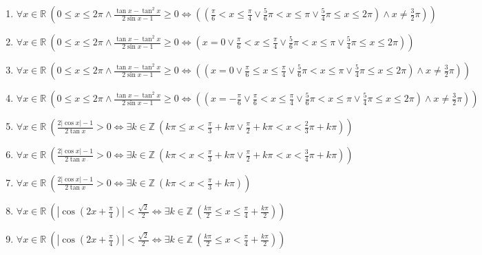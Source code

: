\documentclass[11pt,a4paper]{article}
\begin{document}
\begin{enumerate}
\item $\displaystyle \forall x \in \mathbb{R}\ \left( 0 \le x \le 2\pi \land \frac{\tan x - \tan^{2} x}{2\sin x - 1} \ge 0 \iff \left( \left(\frac{\pi}{6} < x \le \frac{\pi}{4} \lor \frac{5}{6}\pi < x \le \pi \lor \frac{5}{4}\pi \le x \le 2\pi\right) \land x \neq \frac{3}{2}\pi \right) \right)$
\item $\displaystyle \forall x \in \mathbb{R}\ \left( 0 \le x \le 2\pi \land \frac{\tan x - \tan^{2} x}{2\sin x - 1} \ge 0 \iff \left( x = 0 \lor \frac{\pi}{6} < x \le \frac{\pi}{4} \lor \frac{5}{6}\pi < x \le \pi \lor \frac{5}{4}\pi \le x \le 2\pi \right) \right)$
\item $\displaystyle \forall x \in \mathbb{R}\ \left( 0 \le x \le 2\pi \land \frac{\tan x - \tan^{2} x}{2\sin x - 1} \ge 0 \iff \left( \left(x = 0 \lor \frac{\pi}{6} \le x \le \frac{\pi}{4} \lor \frac{5}{6}\pi < x \le \pi \lor \frac{5}{4}\pi \le x \le 2\pi\right) \land x \neq \frac{3}{2}\pi \right) \right)$
\item $\displaystyle \forall x \in \mathbb{R}\ \left( 0 \le x \le 2\pi \land \frac{\tan x - \tan^{2} x}{2\sin x - 1} \ge 0 \iff \left( \left(x = -\frac{\pi}{6} \lor \frac{\pi}{6} < x \le \frac{\pi}{4} \lor \frac{5}{6}\pi < x \le \pi \lor \frac{5}{4}\pi \le x \le 2\pi\right) \land x \neq \frac{3}{2}\pi \right) \right)$
\item $\displaystyle \forall x \in \mathbb{R}\ \left( \frac{2\left|\cos x\right| - 1}{2\tan x} > 0 \iff \exists k \in \mathbb{Z}\ \left( k\pi \le x < \frac{\pi}{3} + k\pi \lor \frac{\pi}{2} + k\pi < x < \frac{2}{3}\pi + k\pi \right) \right)$
\item $\displaystyle \forall x \in \mathbb{R}\ \left( \frac{2\left|\cos x\right| - 1}{2\tan x} > 0 \iff \exists k \in \mathbb{Z}\ \left( k\pi < x < \frac{\pi}{3} + k\pi \lor \frac{\pi}{2} + k\pi < x < \frac{3}{4}\pi + k\pi \right) \right)$
\item $\displaystyle \forall x \in \mathbb{R}\ \left( \frac{2\left|\cos x\right| - 1}{2\tan x} > 0 \iff \exists k \in \mathbb{Z}\ \left( k\pi < x < \frac{\pi}{3} + k\pi \right) \right)$
\item $\displaystyle \forall x \in \mathbb{R}\ \left( \left|\cos\left(2x + \frac{\pi}{4}\right)\right| < \frac{\sqrt{2}}{2} \iff \exists k \in \mathbb{Z}\ \left( \frac{k\pi}{2} \le x \le \frac{\pi}{4} + \frac{k\pi}{2} \right) \right)$
\item $\displaystyle \forall x \in \mathbb{R}\ \left( \left|\cos\left(2x + \frac{\pi}{4}\right)\right| < \frac{\sqrt{2}}{2} \iff \exists k \in \mathbb{Z}\ \left( \frac{k\pi}{2} \le x < \frac{\pi}{4} + \frac{k\pi}{2} \right) \right)$

\end{enumerate}
\end{document}
